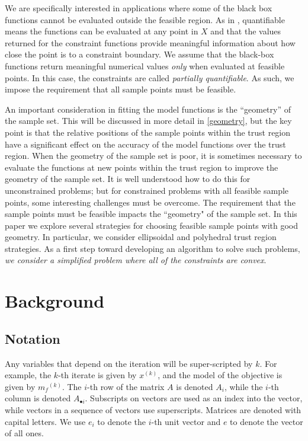 \documentclass{article}
\theoremstyle{case}
\numberwithin{theorem}{subsection}
\newcommand{\mfk}{{{m}_f}^{(k)}}
\newcommand{\xk}{x^{(k)}}
\begin{document}
We are specifically interested in applications where some of the black box functions cannot be evaluated outside the feasible region.
As in \cite{digabel2015taxonomy}, quantifiable means the functions can be evaluated at any point in $X$ and that the values returned for the constraint functions provide meaningful information about how close the point is to a constraint boundary.
We assume that the black-box functions return meaningful numerical values \emph{only} when evaluated at feasible points.
In this case, the constraints are called {\em partially quantifiable}.   
As such, we impose the requirement that all sample points must be feasible.

An important consideration in fitting the model functions is the ``geometry'' of the sample set.
This will be discussed in more detail in \cref{geometry}, but the key point is that the relative positions of the sample points within the trust region have a significant effect on the accuracy of the model functions over the trust region.
When the geometry of the sample set is poor, it is sometimes necessary to evaluate the functions at new points within the trust region to improve the geometry of the sample set.
It is well understood how to do this for unconstrained problems; but for constrained problems with all feasible sample points, some interesting challenges must be overcome.
\color{red}
The requirement that the sample points must be feasible impacts the ``geometry" of the sample set.
In this paper we explore several strategies for choosing feasible sample points with good geometry.
In particular, we consider ellipsoidal and polyhedral trust region strategies.
\color{black}
As a first step toward developing an algorithm to solve such problems, \emph{we consider a simplified problem where all of the constraints are convex}.


\section{Background}

\subsection{Notation}

Any variables that depend on the iteration will be super-scripted by $k$.
For example, the $k$-th iterate is given by $\xk$, and the model of the objective is given by $\mfk$.
The $i$-th row of the matrix $A$ is denoted $A_i$, while the $i$-th column is denoted $A_{\bullet i}$.
Subscripts on vectors are used as an index into the vector, while vectors in a sequence of vectors use superscripts.
Matrices are denoted with capital letters.
We use $e_i$ to denote the $i$-th unit vector and $e$ to denote the vector of all ones.
\end{document}
